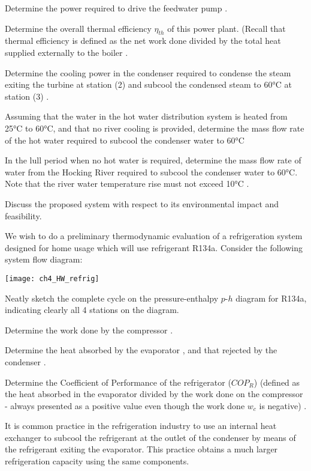 \begin{homework}
\begin{questionparts}
  \item Determine the power required to drive the feedwater pump \answer{ [2.69 kW]}.
  \item Determine the overall thermal efficiency $\eta_{th}$ of this power plant. (Recall that thermal efficiency is defined as the net work done divided by the total heat supplied externally to the boiler \answer{[23\%]}.
  \item Determine the cooling power in the condenser required to condense the steam exiting the turbine at station (2) and subcool the condensed steam to 60°C at station (3) \answer{[1628 kW]}.
  \item Assuming that the water in the hot water distribution system is heated from 25°C to 60°C, and that no river cooling is provided, determine the mass flow rate of the hot water required to subcool the condenser water to 60°C \answer{ [11.1 kg/s]}
  \item In the lull period when no hot water is required, determine the mass flow rate of water from the Hocking River required to subcool the condenser water to 60°C. Note that the river water temperature rise must not exceed 10°C \answer{ [39 kg/s]}.
  \item Discuss the proposed system with respect to its environmental impact and feasibility.
  \end{questionparts}
  \question We wish to do a preliminary thermodynamic evaluation of a refrigeration system designed for home usage which will use refrigerant R134a. Consider the following system flow diagram:
  \begin{center}
    \texttt{[image: ch4\_HW\_refrig]}
  \end{center}
  \begin{questionparts}
  \item Neatly sketch the complete cycle on the pressure-enthalpy $p$-$h$ diagram for R134a, indicating clearly all 4 stations on the diagram.
  \item Determine the work done by the compressor \answer{ [54 kJ/kg]}.
  \item Determine the heat absorbed by the evaporator \answer{ [137 kJ/kg]}, and that rejected by the condenser \answer{ [191 kJ/kg]}.
  \item Determine the Coefficient of Performance of the refrigerator ($COP_R$) (defined as the heat absorbed in the evaporator divided by the work done on the compressor - always presented as a positive value even though the work done $w_c$ is negative) \answer{[$COP_R$ = 2.53]}.
  \end{questionparts}
  \newpage
  \question It is common practice in the refrigeration industry to use an internal heat exchanger to subcool the refrigerant at the outlet of the condenser by means of the refrigerant exiting the evaporator. This practice obtains a much larger refrigeration capacity using the same components.


\end{homework}
